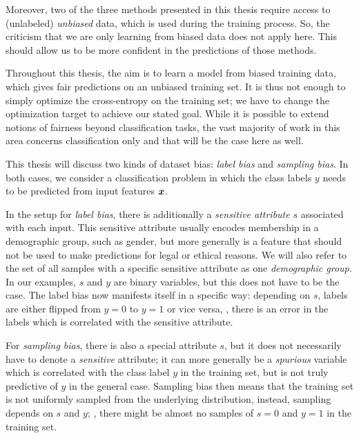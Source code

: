 Moreover, two of the three methods presented in this thesis require access to (unlabeled) \emph{unbiased} data,
which is used during the training process.
So, the criticism that we are only learning from biased data does not apply here.
This should allow us to be more confident in the predictions of those methods.

Throughout this thesis, the aim is to learn a model from biased training data,
which gives fair predictions on an unbiased training set.
It is thus not enough to simply optimize the cross-entropy on the training set;
we have to change the optimization target to achieve our stated goal.
While it is possible to extend notions of fairness beyond classification tasks,
the vast majority of work in this area concerns classification only and that will be the case here as well.

This thesis will discuss two kinds of dataset bias: \emph{label bias} and \emph{sampling bias}.
In both cases,
we consider a classification problem in which the class labels $y$ needs to be predicted from input features ${\bm{x}}$.

In the setup for \emph{label bias},
there is additionally a \emph{sensitive attribute} $s$ associated with each input.
This sensitive attribute usually encodes membership in a demographic group, such as gender,
but more generally is a feature that should not be used to make predictions for legal or ethical reasons.
We will also refer to the set of all samples with a specific sensitive attribute as one \emph{demographic group}.
In our examples, $s$ and $y$ are binary variables, but this does not have to be the case.
The label bias now manifests itself in a specific way:
depending on $s$, labels are either flipped from $y=0$ to $y=1$ or vice versa,
\ie, there is an error in the labels which is correlated with the sensitive attribute.

For \emph{sampling bias},
there is also a special attribute $s$, but it does not necessarily have to denote a \emph{sensitive} attribute;
it can more generally be a \emph{spurious} variable which is correlated with the class label $y$ in the training set,
but is not truly predictive of $y$ in the general case.
Sampling bias then means that the training set is not uniformly sampled from the underlying distribution,
instead, sampling depends on $s$ and $y$;
\eg, there might be almost no samples of $s=0$ and $y=1$ in the training set.


